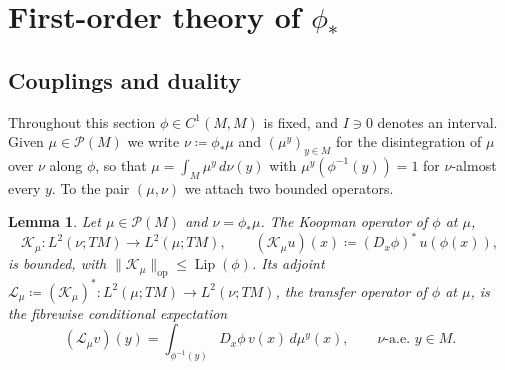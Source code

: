 \documentclass[11pt,reqno]{amsart}
\theoremstyle{plain}
\newtheorem{lem}[thm]{Lemma}
\theoremstyle{definition}
\newcommand{\lto}{\longrightarrow}
\newcommand{\Prob}{\mathcal{P}}
\newcommand{\Koop}{\mathcal{K}}
\newcommand{\Transf}{\mathcal{L}}
\DeclareMathOperator{\Lip}{Lip}
\begin{document}
\section{First-order theory of \texorpdfstring{\(\phi_\ast\)}{phi*}}
    \label{sec:derivatives}
\subsection{Couplings and duality}
\label{sec:couplings}
Throughout this section \( \phi\in C^1(M,M) \) is fixed, and \( I\ni0 \) denotes an interval.
Given \( \mu\in\Prob(M) \) we write \( \nu\coloneqq\phi_\ast\mu \) and \( (\mu^y)_{y\in M} \) for the disintegration of \( \mu \) over \( \nu \) along \( \phi \), so that \( \mu=\int_M\mu^y\,d\nu(y) \) with \( \mu^y\left(\phi^{-1}(y)\right)=1 \) for \( \nu \)-almost every \( y \).
To the pair \( (\mu,\nu) \) we attach two bounded operators.


\begin{lem}
\label{lem:transfer.operator}
    Let \( \mu\in\Prob(M) \) and \( \nu=\phi_\ast\mu \).
    The \emph{Koopman operator} of \( \phi \) at \( \mu \),
    \[
        \Koop_\mu:L^2(\nu;TM)\lto L^2(\mu;TM),
        \qquad
        \left(\Koop_\mu u\right)(x)\coloneqq(D_x\phi)^{\!\ast}\,u\left(\phi(x)\right),
    \]
    is bounded, with \( \lVert\Koop_\mu\rVert_{\mathrm{op}}\le\Lip(\phi) \).
    Its adjoint \( \Transf_\mu\coloneqq(\Koop_\mu)^{\!\ast}:L^2(\mu;TM)\to L^2(\nu;TM) \), the \emph{transfer operator} of \( \phi \) at \( \mu \), is the fibrewise conditional expectation
    \begin{equation}\label{eq:transfer.disintegration}
        \left(\Transf_\mu v\right)(y)=\int_{\phi^{-1}(y)}D_x\phi\,v(x)\,d\mu^y(x),
        \qquad \nu\text{-a.e. }y \in M .
    \end{equation}
\end{lem}
\end{document}
